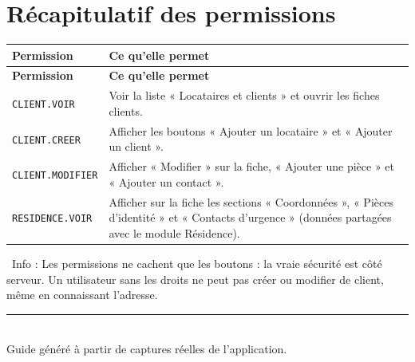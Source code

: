 \documentclass[12pt,a4paper]{article}
\newcommand{\info}[1]{\par\noindent\textcolor{lagoon}{\faInfoCircle\ Info : #1}\par}
\begin{document}
\newpage

\section{Récapitulatif des permissions}\label{sec:permissions}

\begin{longtable}{p{5cm}p{10cm}}
\toprule
\textbf{Permission} & \textbf{Ce qu'elle permet} \\
\midrule
\endfirsthead
\toprule
\textbf{Permission} & \textbf{Ce qu'elle permet} \\
\midrule
\endhead
\bottomrule
\endfoot
\bottomrule
\endlastfoot

\texttt{CLIENT.VOIR} & Voir la liste « Locataires et clients » et ouvrir les fiches clients. \\
\texttt{CLIENT.CREER} & Afficher les boutons « Ajouter un locataire » et « Ajouter un client ». \\
\texttt{CLIENT.MODIFIER} & Afficher « Modifier » sur la fiche, « Ajouter une pièce » et « Ajouter un contact ». \\
\texttt{RESIDENCE.VOIR} & Afficher sur la fiche les sections « Coordonnées », « Pièces d'identité » et « Contacts d'urgence » (données partagées avec le module Résidence). \\

\end{longtable}

\info{Les permissions ne cachent que les boutons : la vraie sécurité est côté serveur. Un utilisateur sans les droits ne peut pas créer ou modifier de client, même en connaissant l'adresse.}

\vspace{1cm}
\begin{center}
  \textcolor{muted}{\rule{0.6\textwidth}{0.4pt}}\\[0.5em]
  \textcolor{muted}{Guide généré à partir de captures réelles de l'application.}
\end{center}
\end{document}
